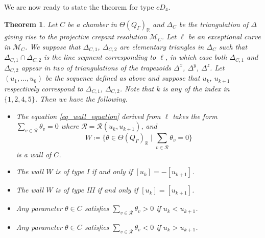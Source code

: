 \documentclass[pdftex]{sigma}
\numberwithin{equation}{section}
\newtheorem{Theorem}{Theorem}[section]
\theoremstyle{definition}
\newcommand{\RR}{\mathbb{R}}
\newcommand{\calM}{\mathcal{M}}
\newcommand{\calR}{\mathcal{R}}
\newcommand{\typeIII}{{\rm I\hspace{-0.7pt}I\hspace{-0.7pt}I}}
\begin{document}
We are now ready to state the theorem for type $cD_4$.

\begin{Theorem}\label{thm_main_cD4_1}
Let $C$ be a chamber in $\Theta(Q_\Gamma)_\RR$ and $\Delta_C$ be the triangulation of $\Delta$ giving rise to
the projective crepant resolution $\calM_C$. Let $\ell$ be an exceptional curve in $\calM_C$.
We suppose that $\Delta_{C,1}$, $\Delta_{C,2}$ are elementary triangles in $\Delta_C$ such that $\Delta_{C,1}\cap \Delta_{C,2}$ is the line segment corresponding to $\ell$,
in which case both $\Delta_{C,1}$ and $\Delta_{C,2}$ appear in two of triangulations of the trapezoids $\Delta^x$, $\Delta^y$, $\Delta^z$.
Let $(u_1, \dots, u_6)$ be the sequence defined as above and suppose that $u_k$, $u_{k+1}$ respectively correspond to $\Delta_{C,1}$, $\Delta_{C,2}$.
Note that $k$ is any of the index in $\{1,2,4,5\}$. Then we have the following.
\begin{itemize}\itemsep=0pt
\item[$(1)\hphantom{{}'}$] The equation \eqref{eq_wall_equation} derived from $\ell$ takes the form
$\sum_{v\in \calR}\theta_v=0$ where $\calR=\calR(u_k, u_{k+1})$, and
\[
W\coloneqq \biggl\{\theta\in\Theta(Q_\Gamma)_\RR \mid \sum_{v\in \calR}\theta_v=0 \biggr\}
\]
is a wall of $C$.
\item[$(2)\hphantom{{}'}$] The wall $W$ is of type {\rm I} if and only if $[u_k]=-[u_{k+1}]$.
\item[$(2)'$] The wall $W$ is of type {\typeIII} if and only if $[u_k]=[u_{k+1}]$.
\item[$(3)\hphantom{{}'}$] Any parameter $\theta\in C$ satisfies $\sum_{v\in \calR}\theta_v>0$ if $u_k< u_{k+1}$.
\item[$(3)'$] Any parameter $\theta\in C$ satisfies $\sum_{v\in \calR}\theta_v<0$ if $u_k> u_{k+1}$.
\end{itemize}
\end{Theorem}
\end{document}
